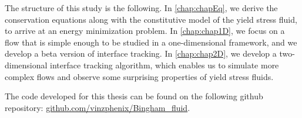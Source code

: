 \documentclass[11 pt]{report}
\begin{document}
The structure of this study is the following. In \cref{chap:chapEq}, we derive the conservation equations along with the constitutive model of the yield stress fluid, to arrive at an energy minimization problem. In \cref{chap:chap1D}, we focus on a flow that is simple enough to be studied in a one-dimensional framework, and we develop a beta version of interface tracking. In \cref{chap:chap2D}, we develop a two-dimensional interface tracking algorithm, which enables us to simulate more complex flows and observe some surprising properties of yield stress fluids.

The code developed for this thesis can be found on the following github repository: \url{github.com/vinzphenix/Bingham_fluid}.



\end{document}
